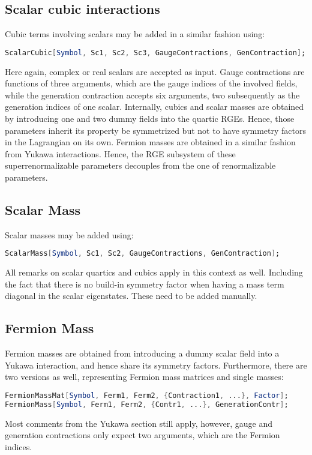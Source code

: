 \documentclass{scrartcl}
\begin{document}
\subsection{Scalar cubic interactions}
Cubic terms involving scalars may be added in a similar fashion using:
\begin{lstlisting}[language=mathematica,mathescape,columns=flexible,backgroundcolor=\color{light-gray}]
ScalarCubic[Symbol, Sc1, Sc2, Sc3, GaugeContractions, GenContraction];
\end{lstlisting}
Here again, complex or real scalars are accepted as input. Gauge contractions are functions of three arguments, which are the gauge indices of the involved fields, while the generation contraction accepts six arguments, two subsequently as the generation indices of one scalar. Internally, cubics and scalar masses are obtained by introducing one and two dummy fields into the quartic RGEs. Hence, those parameters inherit its property be symmetrized but not to have symmetry factors in the Lagrangian on its own. Fermion masses are obtained in a similar fashion from Yukawa interactions. Hence, the RGE subsystem of these superrenormalizable parameters decouples from the one of renormalizable parameters.
\subsection{Scalar Mass}
Scalar masses may be added using:
\begin{lstlisting}[language=mathematica,mathescape,columns=flexible,backgroundcolor=\color{light-gray}]
ScalarMass[Symbol, Sc1, Sc2, GaugeContractions, GenContraction];
\end{lstlisting}
All remarks on scalar quartics and cubics apply in this context as well. Including the fact that there is no build-in symmetry factor when having a mass term diagonal in the scalar eigenstates. These need to be added manually.
\subsection{Fermion Mass}
Fermion masses are obtained from introducing a dummy scalar field into a Yukawa interaction, and hence share its symmetry factors. Furthermore, there are two versions as well, representing Fermion mass matrices and single masses:
\begin{lstlisting}[language=mathematica,mathescape,columns=flexible,backgroundcolor=\color{light-gray}]
FermionMassMat[Symbol, Ferm1, Ferm2, {Contraction1, ...}, Factor];
FermionMass[Symbol, Ferm1, Ferm2, {Contr1, ...}, GenerationContr];
\end{lstlisting}
Most comments from the Yukawa section still apply, however, gauge and generation contractions only expect two arguments, which are the Fermion indices.
\end{document}
